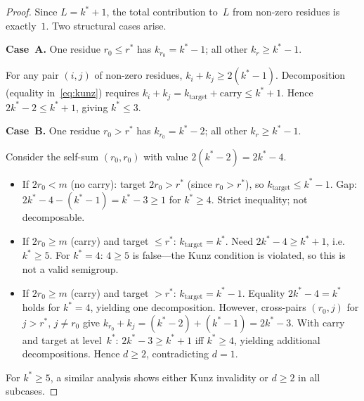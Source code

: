 \documentclass[11pt,a4paper]{amsart}
\theoremstyle{definition}
\theoremstyle{remark}
\begin{document}
\begin{proof}
Since $L = k^* + 1$, the total contribution to~$L$ from non-zero
residues is exactly~$1$.  Two structural cases arise.

\medskip\noindent\textbf{Case~A.}
One residue $r_0 \le r^*$ has $k_{r_0} = k^*{-}1$;
all other $k_r \ge k^*{-}1$.

For any pair $(i,j)$ of non-zero residues,
$k_i + k_j \ge 2(k^*{-}1)$.
Decomposition (equality in~\eqref{eq:kunz}) requires
$k_i + k_j = k_{\mathrm{target}} + \mathrm{carry} \le k^* + 1$.
Hence $2k^*{-}2 \le k^*{+}1$, giving $k^* \le 3$.

\medskip\noindent\textbf{Case~B.}
One residue $r_0 > r^*$ has $k_{r_0} = k^*{-}2$;
all other $k_r \ge k^*{-}1$.

Consider the self-sum $(r_0, r_0)$ with value $2(k^*{-}2) = 2k^*{-}4$.

\begin{itemize}[nosep]
\item If $2r_0 < m$ (no carry): target $2r_0 > r^*$ (since $r_0 > r^*$),
  so $k_{\mathrm{target}} \le k^*{-}1$.
  Gap: $2k^*{-}4 - (k^*{-}1) = k^*{-}3 \ge 1$ for $k^* \ge 4$.
  Strict inequality; not decomposable.

\item If $2r_0 \ge m$ (carry) and target $\le r^*$:
  $k_{\mathrm{target}} = k^*$.  Need $2k^*{-}4 \ge k^* + 1$,
  i.e.\ $k^* \ge 5$.  For $k^* = 4$: $4 \ge 5$ is false---the
  Kunz condition is violated, so this is not a valid semigroup.

\item If $2r_0 \ge m$ (carry) and target $> r^*$:
  $k_{\mathrm{target}} = k^*{-}1$.  Equality $2k^*{-}4 = k^*$ holds
  for $k^* = 4$, yielding one decomposition.
  However, cross-pairs $(r_0, j)$ for $j > r^*$, $j \ne r_0$
  give $k_{r_0} + k_j = (k^*{-}2) + (k^*{-}1) = 2k^*{-}3$.
  With carry and target at level~$k^*$:
  $2k^*{-}3 \ge k^* + 1$ iff $k^* \ge 4$, yielding additional
  decompositions.  Hence $d \ge 2$, contradicting $d = 1$.
\end{itemize}

For $k^* \ge 5$, a similar analysis shows either Kunz invalidity or
$d \ge 2$ in all subcases.
\end{proof}
\end{document}
